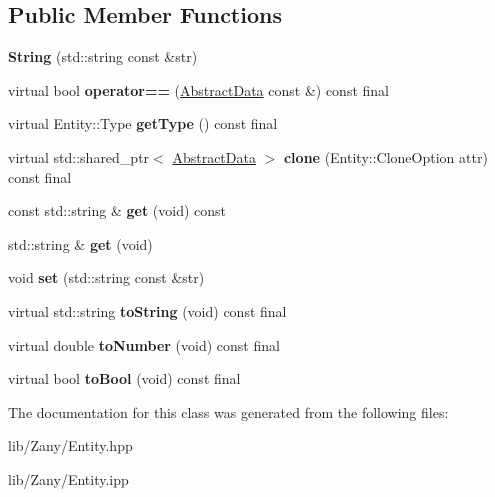 \subsection*{Public Member Functions}
\begin{DoxyCompactItemize}
\item 
\mbox{\label{classzany_1_1_string_a0371e1e84882564440eefaae38ec34b5}} 
{\bfseries String} (std\+::string const \&str)
\item 
\mbox{\label{classzany_1_1_string_a7462741f15fab8d4d3aa7b23241f0d64}} 
virtual bool {\bfseries operator==} (\hyperlink{classzany_1_1_abstract_data}{Abstract\+Data} const \&) const final
\item 
\mbox{\label{classzany_1_1_string_a0fa5576ddeb6e5754bb7b91ceb7d9b95}} 
virtual Entity\+::\+Type {\bfseries get\+Type} () const final
\item 
\mbox{\label{classzany_1_1_string_afaeaceda70660d49b14c375aa5123223}} 
virtual std\+::shared\+\_\+ptr$<$ \hyperlink{classzany_1_1_abstract_data}{Abstract\+Data} $>$ {\bfseries clone} (Entity\+::\+Clone\+Option attr) const final
\item 
\mbox{\label{classzany_1_1_string_a480f644de3cf1874bf29f950924ef60c}} 
const std\+::string \& {\bfseries get} (void) const
\item 
\mbox{\label{classzany_1_1_string_a30da917cb0f2c2b96b79fc12090e61c8}} 
std\+::string \& {\bfseries get} (void)
\item 
\mbox{\label{classzany_1_1_string_a8623155766a4bf5ed65144d6415d36ca}} 
void {\bfseries set} (std\+::string const \&str)
\item 
\mbox{\label{classzany_1_1_string_ac7fd25b04251700158e01cb394349d20}} 
virtual std\+::string {\bfseries to\+String} (void) const final
\item 
\mbox{\label{classzany_1_1_string_acf5926733e676ee1a408eafeabfa206a}} 
virtual double {\bfseries to\+Number} (void) const final
\item 
\mbox{\label{classzany_1_1_string_a64e1607717bb07e5bd61723676dbf386}} 
virtual bool {\bfseries to\+Bool} (void) const final
\end{DoxyCompactItemize}


The documentation for this class was generated from the following files\+:\begin{DoxyCompactItemize}
\item 
lib/\+Zany/Entity.\+hpp\item 
lib/\+Zany/Entity.\+ipp\end{DoxyCompactItemize}
